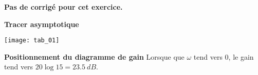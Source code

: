 \normaltrue \difficilefalse \tdifficilefalse
\correctiontrue


\setcounter{numques}{0}
\ifcorrection
\else
\textbf{Pas de corrigé pour cet exercice.}
\fi


\ifprof 
\else
 \fi
 

\ifprof

\textbf{Tracer asymptotique}

\begin{center}
\texttt{[image: tab\_01]}
\end{center}



\textbf{Positionnement du diagramme de gain}
Lorsque que $\omega$ tend vers 0, le gain tend vers $20 \log 15 = \SI{23,5}{dB}$.


